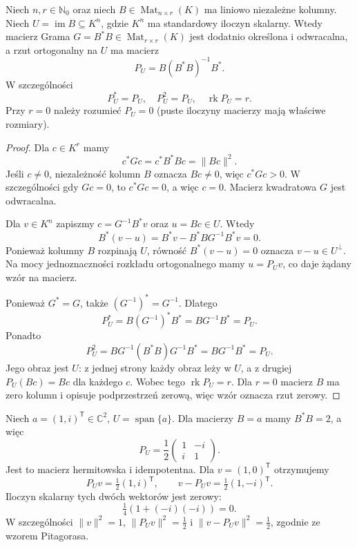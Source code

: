 \begin{twierdzenie}
\label{thm:lin13-projection-gram}
Niech \(n,r\in\mathbb N_0\)
oraz niech \(B\in\operatorname{Mat}_{n\times r}(K)\)
ma liniowo niezależne kolumny.
Niech \(U=\operatorname{im}B\subseteq K^n\),
gdzie \(K^n\) ma standardowy
iloczyn skalarny.
Wtedy macierz Grama
\(G=B^*B\in\operatorname{Mat}_{r\times r}(K)\)
jest dodatnio określona i odwracalna,
a rzut ortogonalny na \(U\) ma macierz
\[
 P_U=B(B^*B)^{-1}B^*.
\]
W szczególności
\[
 P_U^*=P_U,\quad
 P_U^2=P_U,\quad
 \operatorname{rk}P_U=r.
\]
Przy \(r=0\) należy rozumieć
\(P_U=0\) (puste iloczyny
macierzy mają właściwe rozmiary).
\end{twierdzenie}
\begin{proof}
Dla \(c\in K^r\) mamy
\[
 c^*Gc=c^*B^*Bc=\|Bc\|^2.
\]
Jeśli \(c\ne0\), niezależność
kolumn \(B\) oznacza \(Bc\ne0\),
więc \(c^*Gc>0\).
W szczególności gdy \(Gc=0\),
to \(c^*Gc=0\), a więc \(c=0\).
Macierz kwadratowa \(G\)
jest odwracalna.

Dla \(v\in K^n\) zapiszmy
\(c=G^{-1}B^*v\)
oraz \(u=Bc\in U\).
Wtedy
\[
 B^*(v-u)
 =B^*v-B^*BG^{-1}B^*v=0.
\]
Ponieważ kolumny \(B\)
rozpinają \(U\), równość
\(B^*(v-u)=0\) oznacza
\(v-u\in U^\perp\).
Na mocy jednoznaczności
rozkładu ortogonalnego
mamy \(u=P_Uv\),
co daje żądany wzór na macierz.

Ponieważ \(G^*=G\), także
\((G^{-1})^*=G^{-1}\).
Dlatego
\[
 P_U^*=B(G^{-1})^*B^*
      =BG^{-1}B^*=P_U.
\]
Ponadto
\[
 P_U^2
 =BG^{-1}(B^*B)G^{-1}B^*
 =BG^{-1}B^*=P_U.
\]
Jego obraz jest \(U\):
z jednej strony każdy obraz
leży w \(U\), a z drugiej
\(P_U(Bc)=Bc\) dla każdego \(c\).
Wobec tego \(\operatorname{rk}P_U=r\).
Dla \(r=0\) macierz \(B\)
ma zero kolumn i opisuje
podprzestrzeń zerową,
więc wzór oznacza rzut zerowy.
\end{proof}

\begin{przyklad}
\label{prz:lin13-complex-projection}
Niech
\(a=(1,i)^{\mathsf T}\in\mathbb C^2\),
\(U=\operatorname{span}\{a\}\).
Dla macierzy \(B=a\) mamy
\(B^*B=2\), a więc
\[
 P_U=\frac12
 \begin{pmatrix}1&-i\\i&1\end{pmatrix}.
\]
Jest to macierz hermitowska
i idempotentna.
Dla \(v=(1,0)^{\mathsf T}\)
otrzymujemy
\[
 P_Uv=\tfrac12(1,i)^{\mathsf T},
 \qquad
 v-P_Uv=\tfrac12(1,-i)^{\mathsf T}.
\]
Iloczyn skalarny tych
dwóch wektorów jest zerowy:
\[
 \tfrac14(1+(-i)(-i))=0.
\]
W szczególności
\(\|v\|^2=1\),
\(\|P_Uv\|^2=\tfrac12\)
i \(\|v-P_Uv\|^2=\tfrac12\),
zgodnie ze wzorem Pitagorasa.
\end{przyklad}


